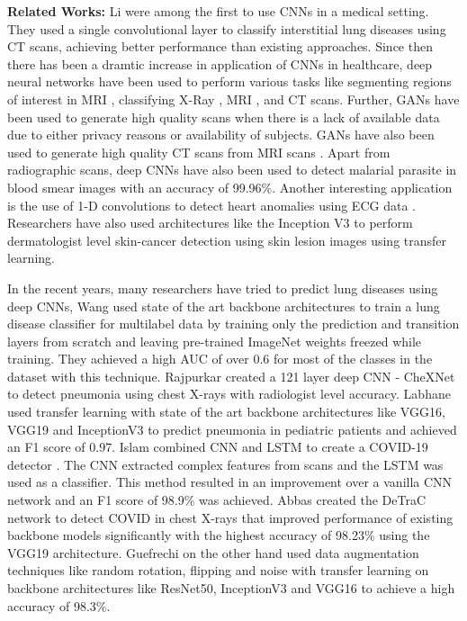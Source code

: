 \documentclass[10pt,twocolumn,letterpaper]{article}
\begin{document}
\textbf{Related Works:} 
Li \etal \cite{li2014medical} were among the first
to use CNNs in a medical setting. They used a single convolutional layer to classify 
interstitial lung diseases using CT scans, achieving better performance than existing 
approaches. Since then there has been a dramtic increase in application of CNNs 
in healthcare, deep neural networks have been used to perform various tasks like 
segmenting regions of interest in MRI \cite{kayalibay2017cnn,dolz2018hyperdense}, classifying X-Ray  
\cite{rajpurkar2017chexnet}, MRI \cite{farooq2017deep}, and CT \cite{alakwaa2017lung} scans.
Further, GANs have been used to generate high quality scans \cite{loey2020within} 
when there is a lack of available data due to either privacy reasons or availability of subjects. 
GANs have also been used to generate high quality CT scans from MRI scans 
\cite{liu2021ct}. Apart from radiographic scans,
deep CNNs have also been used to detect malarial parasite in blood smear images 
\cite{umer2020novel} with an accuracy of 99.96\%. Another interesting 
application is the use of 1-D convolutions to detect heart anomalies using ECG data
\cite{kiranyaz2015real}. Researchers have also used architectures like the Inception V3 to perform 
dermatologist level skin-cancer detection using skin lesion images \cite{esteva2017dermatologist} using transfer 
learning.  

In the recent years, many researchers have tried to predict lung diseases using deep CNNs, 
Wang \etal \cite{wang2017chestx} used state of the art backbone architectures to train 
a lung disease classifier for multilabel data by training only the prediction and transition 
layers from scratch and leaving pre-trained ImageNet weights freezed while training. 
They achieved a high AUC of over 0.6 for most of the classes in the dataset with this technique.
Rajpurkar \etal \cite{rajpurkar2017chexnet} created a 121 layer deep CNN - CheXNet to detect
pneumonia using chest X-rays with radiologist level accuracy. 
Labhane \etal \cite{labhane2020detection} used transfer learning with state of the art backbone architectures like VGG16, 
VGG19 and InceptionV3 to predict pneumonia in pediatric patients and achieved an F1 score of 0.97.
Islam \etal combined CNN and LSTM 
to create a COVID-19 detector \cite{islam2020combined}. The CNN extracted complex features from scans and the LSTM was 
used as a classifier. This method resulted in an improvement over a vanilla CNN network and 
an F1 score of 98.9\% was achieved. Abbas \etal \cite{abbas2021classification} created the 
DeTraC network to detect COVID in chest X-rays that improved performance of existing backbone 
models significantly with the highest accuracy of 98.23\% using the VGG19 architecture.  
Guefrechi \etal \cite{guefrechi2021deep} on the other hand used data augmentation techniques like random rotation, 
flipping and noise with transfer learning on backbone architectures like ResNet50, 
InceptionV3 and VGG16 to achieve a high accuracy of 98.3\%.
\end{document}
